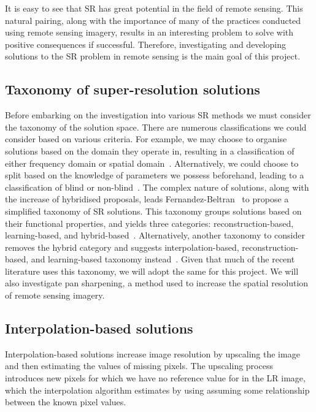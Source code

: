 It is easy to see that SR has great potential in the field of remote sensing. This natural pairing, along with the importance of many of the practices conducted using remote sensing imagery, results in an interesting problem to solve with positive consequences if successful. Therefore, investigating and developing solutions to the SR problem in remote sensing is the main goal of this project.

\subsection{Taxonomy of super-resolution solutions}
Before embarking on the investigation into various SR methods we must consider the taxonomy of the solution space. There are numerous classifications we could consider based on various criteria. For example, we may choose to organise solutions based on the domain they operate in, resulting in a classification of either frequency domain or spatial domain~\cite{superResRemoteSensingOverview}. Alternatively, we could choose to split based on the knowledge of parameters we possess beforehand, leading to a classification of blind or non-blind~\cite{superResRemoteSensingOverview}. The complex nature of solutions, along with the increase of hybridised proposals, leads Fernandez-Beltran \etal\ to propose a simplified taxonomy of SR solutions. This taxonomy groups solutions based on their functional properties, and yields three categories: reconstruction-based, learning-based, and hybrid-based~\cite{superResRemoteSensingOverview}. Alternatively, another taxonomy to consider removes the hybrid category and suggests interpolation-based, reconstruction-based, and learning-based taxonomy instead~\cite{remoteSensingDeepLearningReview, remoteSensingGANsReview, isrgan, tesagan}. Given that much of the recent literature uses this taxonomy, we will adopt the same for this project. We will also investigate pan sharpening, a method used to increase the spatial resolution of remote sensing imagery.

\subsection{Interpolation-based solutions}
Interpolation-based solutions increase image resolution by upscaling the image and then estimating the values of missing pixels. The upscaling process introduces new pixels for which we have no reference value for in the LR image, which the interpolation algorithm estimates by using assuming some relationship between the known pixel values. 

